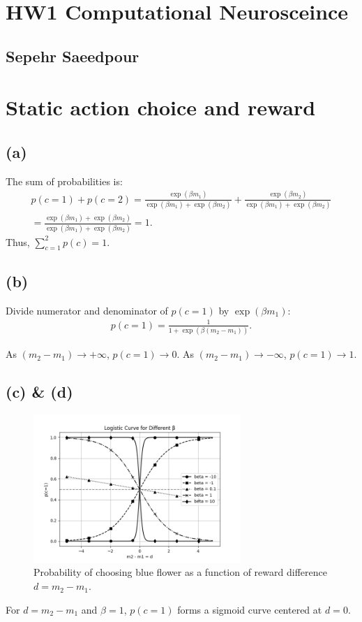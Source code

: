 \documentclass{article}
\begin{document}
\section*{HW1 Computational Neurosceince}
\subsection*{Sepehr Saeedpour}

\section{Static action choice and reward}

\subsection*{(a)}
The sum of probabilities is:
\begin{align}
p(c=1) + p(c=2) = \frac{\exp(\beta m_1)}{\exp(\beta m_1) + \exp(\beta m_2)} + \frac{\exp(\beta m_2)}{\exp(\beta m_1) + \exp(\beta m_2)}\\
= \frac{\exp(\beta m_1) + \exp(\beta m_2)}{\exp(\beta m_1) + \exp(\beta m_2)} = 1.
\end{align}
Thus, \(\sum_{c=1}^2 p(c) = 1\).

\subsection*{(b)}
Divide numerator and denominator of \(p(c=1)\) by \(\exp(\beta m_1)\):
\begin{align}
p(c=1) = \frac{1}{1 + \exp(\beta(m_2 - m_1))}.
\end{align}


As $(m_2 - m_1) \to +\infty$, $p(c=1) \to 0$. As $(m_2 - m_1) \to -\infty$, $p(c=1) \to 1$.

\subsection*{(c) \& (d)}


\begin{figure}[h]
    \centering
    \includegraphics[width=0.7\textwidth]{logistic_curve.png}
    \caption{Probability of choosing blue flower as a function of reward difference $d = m_2 - m_1$.}
    \label{fig:softmax-choice}
\end{figure}
For \(d = m_2 - m_1\) and \(\beta = 1\), \(p(c=1)\) forms a sigmoid curve centered at \(d = 0\).
\end{document}
